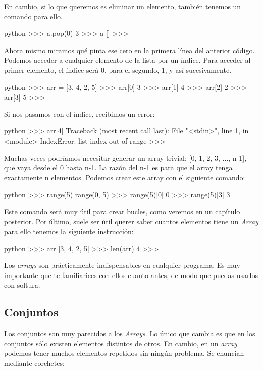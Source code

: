 \documentclass{article}
\begin{document}
En cambio, si lo que queremos es eliminar un elemento, también tenemos un comando para ello.

\begin{mintedbox}{python}
>>> a.pop(0)
3
>>> a
[]
>>> 
\end{mintedbox}

Ahora mismo miramos qué pinta ese cero en la primera línea del anterior código.
Podemos acceder a cualquier elemento de la lista por un índice. Para acceder al primer elemento, el índice será 0, para el segundo, 1, y así sucesivamente.

\begin{mintedbox}{python}
>>> arr = [3, 4, 2, 5]
>>> arr[0]
3
>>> arr[1]
4
>>> arr[2]
2
>>> arr[3]
5
>>>
\end{mintedbox}

Si nos pasamos con el índice, recibimos un error:

\begin{mintedbox}{python}
>>> arr[4]
Traceback (most recent call last):
  File "<stdin>", line 1, in <module>
IndexError: list index out of range
>>> 

\end{mintedbox}
Muchas veces podríamos necesitar generar un array trivial: [0, 1, 2, 3, ..., n-1], que vaya desde el 0 hasta n-1. La razón del n-1 es para que el array tenga exactamente n elementos. Podemos crear este array con el siguiente comando:
\begin{mintedbox}{python}
>>> range(5)
range(0, 5)
>>> range(5)[0]
0
>>> range(5)[3]
3
\end{mintedbox}

Este comando será muy útil para crear bucles, como veremos en un capítulo posterior.
Por último, suele ser útil querer saber cuantos elementos tiene un \textit{Array} para ello tenemos la siguiente instrucción:
\begin{mintedbox}{python}
>>> arr
[3, 4, 2, 5]
>>> len(arr)
4
>>> 
\end{mintedbox}
Los \textit{arrays} son prácticamente indispensables en cualquier programa. Es muy importante que te familiarices con ellos cuanto antes, de modo que puedas usarlos con soltura.
\subsection{Conjuntos}
Los conjuntos son muy parecidos a los \textit{Arrays}. Lo único que cambia es que en los conjuntos sólo existen elementos distintos de otros. En cambio, en un \textit{array} podemos tener muchos elementos repetidos sin ningún problema. Se enuncian mediante corchetes:
\end{document}
